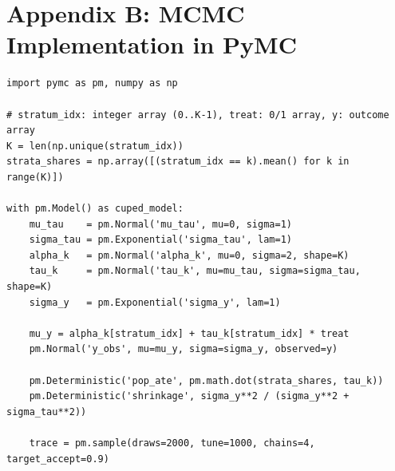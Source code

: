 \documentclass[12pt]{article}
\theoremstyle{plain}
\theoremstyle{definition}
\begin{document}
\section*{Appendix B: MCMC Implementation in PyMC}
\label{app:mcmc}

\begin{verbatim}
import pymc as pm, numpy as np

# stratum_idx: integer array (0..K-1), treat: 0/1 array, y: outcome array
K = len(np.unique(stratum_idx))
strata_shares = np.array([(stratum_idx == k).mean() for k in range(K)])

with pm.Model() as cuped_model:
    mu_tau    = pm.Normal('mu_tau', mu=0, sigma=1)
    sigma_tau = pm.Exponential('sigma_tau', lam=1)
    alpha_k   = pm.Normal('alpha_k', mu=0, sigma=2, shape=K)
    tau_k     = pm.Normal('tau_k', mu=mu_tau, sigma=sigma_tau, shape=K)
    sigma_y   = pm.Exponential('sigma_y', lam=1)

    mu_y = alpha_k[stratum_idx] + tau_k[stratum_idx] * treat
    pm.Normal('y_obs', mu=mu_y, sigma=sigma_y, observed=y)

    pm.Deterministic('pop_ate', pm.math.dot(strata_shares, tau_k))
    pm.Deterministic('shrinkage', sigma_y**2 / (sigma_y**2 + sigma_tau**2))

    trace = pm.sample(draws=2000, tune=1000, chains=4, target_accept=0.9)
\end{verbatim}
\end{document}
